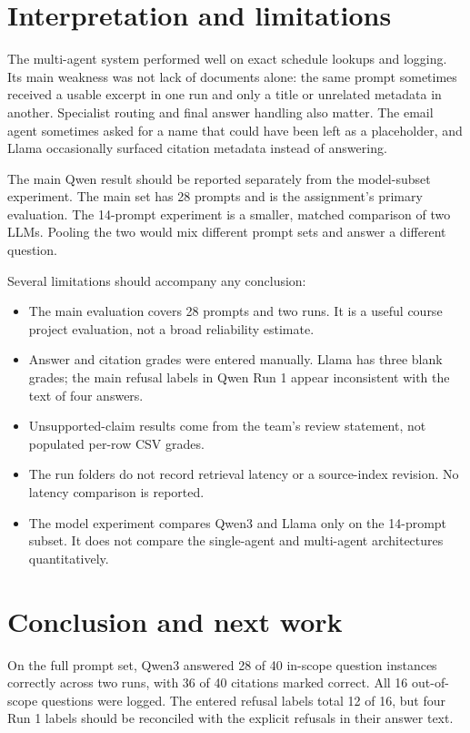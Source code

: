 \documentclass[11pt,a4paper]{article}
\begin{document}
\section{Interpretation and limitations}

The multi-agent system performed well on exact schedule lookups and logging. Its main weakness was not lack of documents alone: the same prompt sometimes received a usable excerpt in one run and only a title or unrelated metadata in another. Specialist routing and final answer handling also matter. The email agent sometimes asked for a name that could have been left as a placeholder, and Llama occasionally surfaced citation metadata instead of answering.

The main Qwen result should be reported separately from the model-subset experiment. The main set has 28 prompts and is the assignment's primary evaluation. The 14-prompt experiment is a smaller, matched comparison of two LLMs. Pooling the two would mix different prompt sets and answer a different question.

Several limitations should accompany any conclusion:
\begin{itemize}
  \item The main evaluation covers 28 prompts and two runs. It is a useful course project evaluation, not a broad reliability estimate.
  \item Answer and citation grades were entered manually. Llama has three blank grades; the main refusal labels in Qwen Run 1 appear inconsistent with the text of four answers.
  \item Unsupported-claim results come from the team's review statement, not populated per-row CSV grades.
  \item The run folders do not record retrieval latency or a source-index revision. No latency comparison is reported.
  \item The model experiment compares Qwen3 and Llama only on the 14-prompt subset. It does not compare the single-agent and multi-agent architectures quantitatively.
\end{itemize}

\section{Conclusion and next work}

On the full prompt set, Qwen3 answered 28 of 40 in-scope question instances correctly across two runs, with 36 of 40 citations marked correct. All 16 out-of-scope questions were logged. The entered refusal labels total 12 of 16, but four Run 1 labels should be reconciled with the explicit refusals in their answer text.
\end{document}
